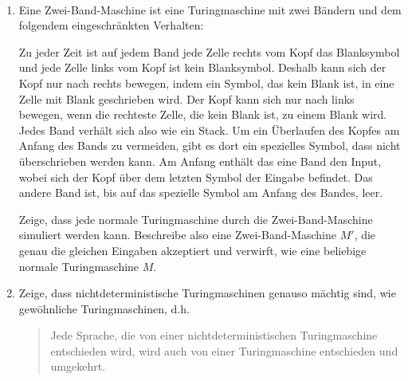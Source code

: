 \documentclass{uebung_cs}
\begin{document}
\begin{aufgabe}[Turingmaschinen V]\
	\begin{enumerate}
		\item Eine Zwei-Band-Maschine ist eine Turingmaschine mit zwei Bändern und dem folgendem eingeschränkten Verhalten:
		
		Zu jeder Zeit ist auf jedem Band jede Zelle rechts vom Kopf das Blanksymbol und jede Zelle links vom Kopf ist kein Blanksymbol. Deshalb kann sich der Kopf nur nach rechts bewegen, indem ein Symbol, das kein Blank ist, in eine Zelle mit Blank geschrieben wird. Der Kopf kann sich nur nach links bewegen, wenn die rechteste Zelle, die kein Blank ist, zu einem Blank wird. Jedes Band verhält sich also wie ein Stack. Um ein Überlaufen des Kopfes am Anfang des Bands zu vermeiden, gibt es dort ein spezielles Symbol, dass nicht überschrieben werden kann. Am Anfang enthält das eine Band den Input, wobei sich der Kopf über dem letzten Symbol der Eingabe befindet. Das andere Band ist, bis auf das spezielle Symbol am Anfang des Bandes, leer.
		
		Zeige, dass jede normale Turingmaschine durch die Zwei-Band-Maschine simuliert werden kann. Beschreibe also eine Zwei-Band-Maschine $M'$, die genau die gleichen Eingaben akzeptiert und verwirft, wie eine beliebige normale Turingmaschine $M$.
		
		\item Zeige, dass nichtdeterministische Turingmaschinen genauso mächtig sind, wie gewöhnliche Turingmaschinen, d.h.
		\begin{quote}
			Jede Sprache, die von einer nichtdeterministischen Turingmaschine entschieden wird, wird auch von einer Turingmaschine entschieden und umgekehrt.
		\end{quote}
	\end{enumerate}
\end{aufgabe}

\newpage


	
\end{document}
